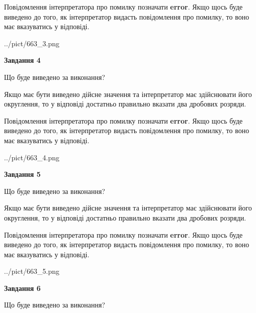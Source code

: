 \documentclass[12pt, ukrainian]{article}
\begin{document}
{\begin {Large}
Повідомлення інтерпретатора про помилку позначати \textbf{error}.
Якщо щось буде виведено до того, як інтерпретатор видасть повідомлення про помилку, 
то воно має вказуватись у відповіді. \par

\begin{center}
	{../pict/663_3.png}
\end{center}
\newpage

{\begin {center}\textbf{Завдання 4}\end {center}}\par
Що буде виведено за виконання? \par

Якщо має бути виведено дійсне значення та інтерпретатор має здійснювати його округлення, 
то у відповіді достатньо правильно вказати два дробових розряди.

Повідомлення інтерпретатора про помилку позначати \textbf{error}.
Якщо щось буде виведено до того, як інтерпретатор видасть повідомлення про помилку, 
то воно має вказуватись у відповіді. \par

\begin{center}
	{../pict/663_4.png}
\end{center}
\newpage

{\begin {center}\textbf{Завдання 5}\end {center}}\par
Що буде виведено за виконання? \par

Якщо має бути виведено дійсне значення та інтерпретатор має здійснювати його округлення, 
то у відповіді достатньо правильно вказати два дробових розряди.

Повідомлення інтерпретатора про помилку позначати \textbf{error}.
Якщо щось буде виведено до того, як інтерпретатор видасть повідомлення про помилку, 
то воно має вказуватись у відповіді. \par

\begin{center}
	{../pict/663_5.png}
\end{center}
\newpage

{\begin {center}\textbf{Завдання 6}\end {center}}\par
Що буде виведено за виконання? \par


\end{Large}}
\end{document}
